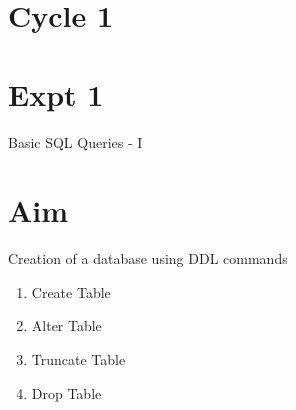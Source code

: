\documentclass[13pt,oneside]{book}
\begin{document}
\section*{Cycle 1}
\section*{Expt 1}
\begin{center}
    \Large{Basic SQL Queries - I}
\end{center}

\section*{Aim}
\large{Creation of a database using DDL commands
	\begin{enumerate}
		\item Create Table
		\item Alter Table
		\item Truncate Table
		\item Drop Table
	\end{enumerate}
}
\end{document}
